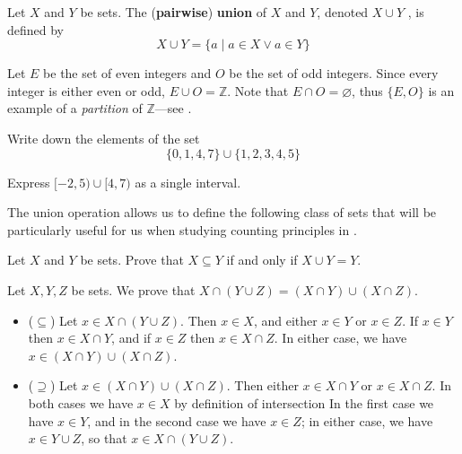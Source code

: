 \begin{definition}
\label{defUnion}
Let $X$ and $Y$ be sets. The (\textbf{pairwise}) \textbf{union} of $X$ and $Y$, denoted $X \cup Y$ , is defined by
\[ X \cup Y = \{ a \mid a \in X \vee a \in Y \} \]
\end{definition}

\begin{example}
Let $E$ be the set of even integers and $O$ be the set of odd integers. Since every integer is either even or odd, $E \cup O = \mathbb{Z}$. Note that $E \cap O = \varnothing$, thus $\{E,O\}$ is an example of a \textit{partition} of $\mathbb{Z}$---see .
\end{example}

\begin{exercise}
Write down the elements of the set
\[ \{ 0, 1, 4, 7 \} \cup \{ 1, 2, 3, 4, 5 \} \]
\end{exercise}

\begin{exercise}
Express $[-2,5) \cup [4,7)$ as a single interval.
\end{exercise}

The union operation allows us to define the following class of sets that will be particularly useful for us when studying counting principles in .

\begin{exercise}
Let $X$ and $Y$ be sets. Prove that $X \subseteq Y$ if and only if $X \cup Y = Y$.
\end{exercise}

\begin{example}
\label{exIntersectionDistributesOverUnion}
Let $X,Y,Z$ be sets. We prove that $X \cap (Y \cup Z) = (X \cap Y) \cup (X \cap Z)$.
\begin{itemize}
\item ($\subseteq$) Let $x \in X \cap (Y \cup Z)$. Then $x \in X$, and either $x \in Y$ or $x \in Z$. If $x \in Y$ then $x \in X \cap Y$, and if $x \in Z$ then $x \in X \cap Z$. In either case, we have $x \in (X \cap Y) \cup (X \cap Z)$.
\item ($\supseteq$) Let $x \in (X \cap Y) \cup (X \cap Z)$. Then either $x \in X \cap Y$ or $x \in X \cap Z$. In both cases we have $x \in X$ by definition of intersection 
In the first case we have $x \in Y$, and in the second case we have $x \in Z$; in either case, we have $x \in Y \cup Z$, so that $x \in X \cap (Y \cup Z)$.
\end{itemize}
\end{example}

